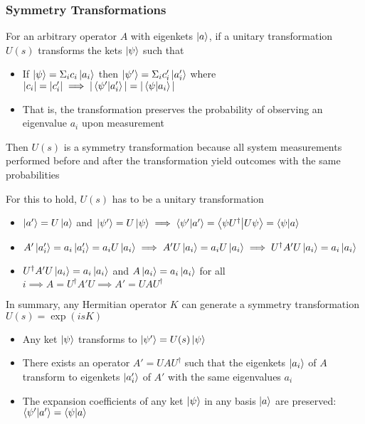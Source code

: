 \documentclass[8pt,t,mathserif,aspectratio=169]{beamer}
\begin{document}
\begin{frame}
  \frametitle{Symmetry Transformations}
  \vspace{1mm}
  For an arbitrary operator $A$ with eigenkets $\ket{a}$, if a unitary transformation $U(s)$ transforms the kets $\ket{\psi}$ such that
  \begin{itemize}
    \item If $\ket{\psi} = \Sigma_i c_i \ket{a_i}$ then $\ket{\psi'} = \Sigma_i c_i' \ket{a_i'}$ where $|c_i| = |c_i'| \implies |\braket{\psi'}{a_i'}| = |\braket{\psi}{a_i}|$ 
    \item That is, the transformation preserves the probability of observing an eigenvalue $a_i$ upon measurement
  \end{itemize}
  Then $U(s)$ is a symmetry transformation because all system measurements performed before and after the transformation yield outcomes with the same probabilities

  For this to hold, $U(s)$ has to be a unitary transformation
  \begin{itemize}
    \item $\ket{a'} = U \ket{a}$ and $\ket{\psi'} = U \ket{\psi} \implies \braket{\psi'}{a'} = \bra{\psi U^{\dagger}}\ket{U \psi} = \braket{\psi}{a}$
    \item $A' \ket{a_i'} = a_i \ket{a_i'} = a_i U \ket{a_i} \implies A' U \ket{a_i} = a_i U \ket{a_i} \implies U^{\dagger} A' U \ket{a_i} = a_i \ket{a_i}$
    \item $U^{\dagger} A' U \ket{a_i} = a_i \ket{a_i}$ and $A \ket{a_i} = a_i \ket{a_i}$ for all $i \implies A = U^{\dagger} A' U \implies A' = U A U^{\dagger}$ 
  \end{itemize}

  In summary, any Hermitian operator $K$ can generate a symmetry transformation $U(s) = \exp(i s K)$
  \begin{itemize}
    \item Any ket $\ket{\psi}$ transforms to $\ket{\psi'} = U(s) \ket{\psi}$
    \item There exists an operator $A' = U A U^{\dagger}$ such that the eigenkets $\ket{a_i}$ of $A$ transform to eigenkets $\ket{a'_i}$ of $A'$ with the same eigenvalues $a_i$
    \item The expansion coefficients of any ket $\ket{\psi}$ in any basis $\ket{a}$ are preserved: $\braket{\psi'}{a'} = \braket{\psi}{a}$
  \end{itemize}
\end{frame}
\end{document}
